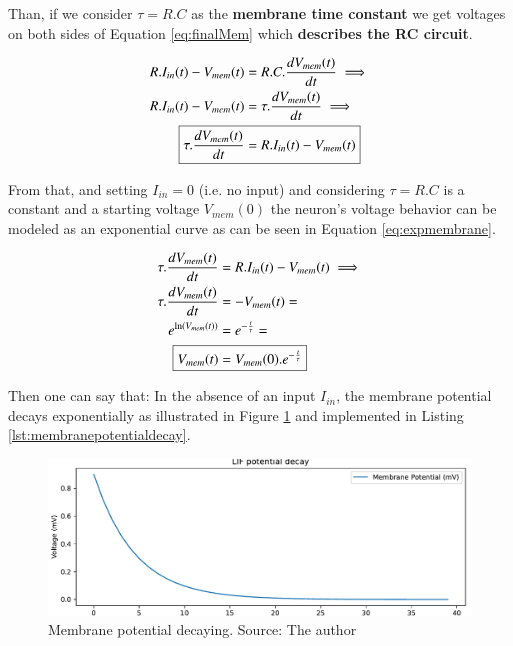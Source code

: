 			\par Than, if we consider $\tau = R.C$ as the \textbf{membrane time constant} we get voltages on both sides of Equation \ref{eq:finalMem} which \textbf{describes the RC circuit}.
		
			\begin{equation}
				\label{eq:finalMem}
				\begin{aligned}
				R.I_{in}(t) - V_{mem}(t) &=  R.C.\dfrac{dV_{mem}(t)}{dt} \implies \\
				R.I_{in}(t) - V_{mem}(t) &=  \tau.\dfrac{dV_{mem}(t)}{dt} \implies \\
				\Aboxed{\tau.\dfrac{dV_{mem}(t)}{dt} &= R.I_{in}(t) - V_{mem}(t)}
				\end{aligned}
			\end{equation}
		
			\par From that, and setting $I_{in} = 0$ (i.e. no input) and considering $\tau = R.C$ is a constant and a starting voltage $V_{mem}(0)$ the neuron's voltage behavior can be modeled as an exponential curve as can be seen in Equation \ref{eq:expmembrane}.
		
		 	\begin{equation}
		 		\label{eq:expmembrane}
		 		\begin{aligned}
		 		\tau.\dfrac{dV_{mem}(t)}{dt} &= R.I_{in}(t) - V_{mem}(t) \implies \\
		 		\tau.\dfrac{dV_{mem}(t)}{dt} &= -V_{mem}(t) = \\
		 		e^{\ln(V_{mem}(t))} &= e^{-\frac{t}{\tau}} = \\
		 		\Aboxed{V_{mem}(t) &= V_{mem}(0).e^{-\frac{t}{\tau}}}
		 		\end{aligned}
		 	\end{equation}
	 	
	 		\par Then one can say that: In the absence of an input $I_{in}$, the membrane potential decays exponentially as illustrated in Figure \ref{fig:membranepotentialdecay} and implemented in Listing \ref{lst:membranepotentialdecay}.
	 		
	 			

		 		\begin{figure}[H]
		 			\centering
		 			\includegraphics[width=\linewidth]{images/membranePotentialDecay}
		 			\caption{Membrane potential decaying. Source: The author}
		 			\label{fig:membranepotentialdecay}
		 		\end{figure}
 			
